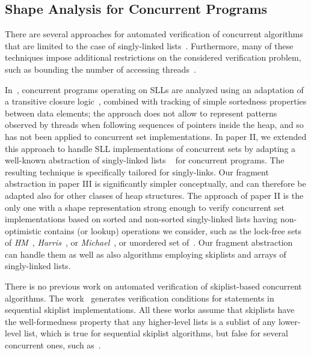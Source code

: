\subsection{Shape Analysis for Concurrent Programs}
There are several approaches for automated verification of concurrent algorithms that are limited to the
case of singly-linked
lists~\cite{AHHR:integrated,meyer:vmcai16,Quy:sas16,Sagiv:correlation,Vafeiadis:cav10}.
Furthermore, many of these techniques impose additional restrictions on the considered verification problem, such as bounding the number of accessing
threads~\cite{Amit:comparisonAbstraction,Vechev:spin09,CernyRZCA:CAV10}.

In~\cite{AHHR:integrated}, concurrent programs operating on SLLs are analyzed
using an adaptation of a transitive closure logic~\cite{BiRa:vmcai06}, combined with
tracking of simple sortedness properties between data elements; the approach does
not allow to represent patterns observed by threads when following sequences of
pointers inside the heap, and so has not been applied to concurrent set
implementations.
In paper II, we extended this approach to handle SLL implementations
of concurrent sets by adapting a
well-known abstraction of singly-linked lists ~\cite{MYRS:Canonical} for concurrent programs.
The resulting technique is specifically tailored for singly-links.
Our fragment abstraction in paper III is significantly simpler conceptually, and can therefore be  adapted
also for other classes of heap structures.
The approach of paper II is the only one with a shape representation strong enough to
verify  concurrent set
implementations based on sorted and non-sorted
singly-linked lists having non-optimistic contains (or lookup) operations we consider, such as
the lock-free sets of {\it HM}~\cite{ArtOfMpP},
{\it Harris}~\cite{Harris:list}, or {\it Michael}~\cite{Michael:list},
or unordered set of~\cite{Zhang:unorderedlist}. Our fragment abstraction can handle them
as well as also algorithms employing skiplists and arrays of singly-linked lists.

There is no previous work on automated verification of skiplist-based concurrent algorithms. The work~\cite{Sanchez:skiplists}
generates verification conditions for statements in sequential skiplist implementations. All these
works assume that skiplists have the well-formedness property that any higher-level lists is a
sublist of any lower-level list, which is true for sequential skiplist algorithms, but false for
several concurrent ones, such as~\cite{ArtOfMpP,Linden:opodis13}.



